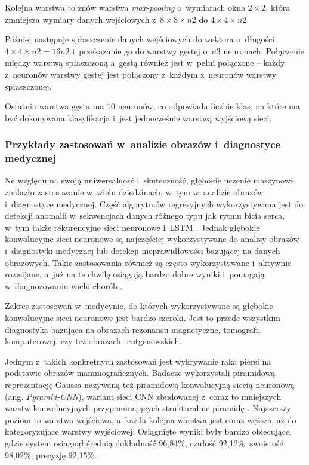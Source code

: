 {Kolejna warstwa to znów warstwa \emph{max-pooling} o~wymiarach okna $2 \times 2$, która zmniejsza wymiary danych wejściowych z~$8 \times 8 \times n2$ do $4 \times 4 \times n2$.

Później następuje spłaszczenie danych wejściowych do wektora o~długości $4 \times 4 \times n2 = 16n2$ i~przekazanie go do warstwy gęstej o~$n3$ neuronach.
Połączenie między warstwą spłaszczoną a~gęstą również jest w~pełni połączone -- każdy z~neuronów warstwy gęstej jest połączony z~każdym z~neuronów warstwy spłaszczonej.

Ostatnia warstwa gęsta ma $10$ neuronów, co odpowiada liczbie klas, na które ma być dokonywana klasyfikacja i~jest jednocześnie warstwą wyjściową sieci.

\subsubsection{Przykłady zastosowań w~analizie obrazów i~diagnostyce medycznej}

Ne względu na swoją uniwersalność i~skuteczność, głębokie uczenie maszynowe znalazło zastosowanie w~wielu dziedzinach, w~tym w~analizie obrazów i~diagnostyce medycznej.
Część algorytmów regresyjnych wykorzystywana jest do detekcji anomalii w~sekwencjach danych różnego typu jak rytmu bicia serca, w~tym także rekurencyjne sieci neuronowe i~LSTM \cite{fernando2021deep}.
Jednak głębokie konwolucyjne sieci neuronowe są najczęściej wykorzystywane do analizy obrazów i~diagnostyki medycznej lub detekcji nieprawidłowości bazującej na danych obrazowych.
Takie zastosowania również są często wykorzystywane i~aktywnie rozwijane, a~już na te chwilę osiągają bardzo dobre wyniki i~pomagają w~diagnozowaniu wielu chorób \cite{liu2017survey}.

Zakres zastosowań w~medycynie, do których wykorzystywane są głębokie konwolucyjne sieci neuronowe jest bardzo szeroki.
Jest to przede wszystkim diagnostyka bazująca na obrazach rezonansu magnetyczne, tomografii komputerowej, czy też obrazach rentgenowskich.

Jednym z~takich konkretnych zastosowań jest wykrywanie raka piersi na podstawie obrazów mammograficznych.
Badacze wykorzystali piramidową reprezentację Gaussa nazywaną też piramidową konwolucyjną siecią neuronową (ang. \emph{Pyramid-CNN}), wariant sieci CNN zbudowanej z~coraz to mniejszych warstw konwolucyjnych przypominających strukturalnie piramidę \cite{bakkouri2019multi}.
Najszerszy poziom to warstwa wejściowa, a~każda kolejna warstwa jest coraz węższa, aż do kategoryzujące warstwy wyjściowej.
Osiągnięte wyniki były bardzo obiecujące, gdzie system osiągnął średnią dokładność 96,84\%, czułość 92,12\%, swoistość 98,02\%, precyzję 92,15\%.

}
